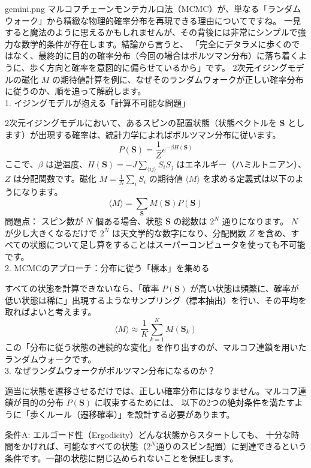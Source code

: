 \documentclass[a4paper,10.5pt]{jlreq}
\begin{document}
\begin{chatbox}{gemini.png}
マルコフチェーンモンテカルロ法（MCMC）が、単なる「ランダムウォーク」から精緻な物理的確率分布を再現できる理由についてですね。
一見すると魔法のように思えるかもしれませんが、その背後には非常にシンプルで強力な数学的条件が存在します。結論から言うと、
「完全にデタラメに歩くのではなく、最終的に目的の確率分布（今回の場合はボルツマン分布）に落ち着くように、歩く方向と確率を意図的に偏らせているから」です。
2次元イジングモデルの磁化 $M$ の期待値計算を例に、なぜそのランダムウォークが正しい確率分布に従うのか、順を追って解説します。\\

1. イジングモデルが抱える「計算不可能な問題」

2次元イジングモデルにおいて、あるスピンの配置状態（状態ベクトルを $\mathbf{S}$ とします）が出現する確率は、統計力学によればボルツマン分布に従います。
$$P(\mathbf{S}) = \frac{1}{Z} e^{-\beta H(\mathbf{S})}$$ここで、$\beta$ は逆温度、$H(\mathbf{S}) = -J\sum_{\langle ij \rangle}S_i S_j$ はエネルギー（ハミルトニアン）、
$Z$ は分配関数です。磁化 $M = \frac{1}{N}\sum_i S_i$ の期待値 $\langle M \rangle$ を求める定義式は以下のようになります。
$$\langle M \rangle = \sum_{\mathbf{S}} M(\mathbf{S}) P(\mathbf{S})$$問題点： スピン数が $N$ 個ある場合、状態 $\mathbf{S}$ の総数は $2^N$ 通りになります。
$N$ が少し大きくなるだけで $2^N$ は天文学的な数字になり、分配関数 $Z$ を含め、すべての状態について足し算をすることはスーパーコンピュータを使っても不可能です。\\

2. MCMCのアプローチ：分布に従う「標本」を集める

すべての状態を計算できないなら、「確率 $P(\mathbf{S})$ が高い状態は頻繁に、確率が低い状態は稀に」出現するようなサンプリング（標本抽出）を行い、その平均を取ればよいと考えます。
$$\langle M \rangle \approx \frac{1}{K} \sum_{k=1}^K M(\mathbf{S}_k)$$この「分布に従う状態の連続的な変化」を作り出すのが、マルコフ連鎖を用いたランダムウォークです。\\

3. なぜランダムウォークがボルツマン分布になるのか？

適当に状態を遷移させるだけでは、正しい確率分布にはなりません。マルコフ連鎖が目的の分布 $P(\mathbf{S})$ に収束するためには、
以下の2つの絶対条件を満たすように「歩くルール（遷移確率）」を設計する必要があります。

条件A: エルゴード性（Ergodicity）どんな状態からスタートしても、
十分な時間をかければ、可能なすべての状態（$2^N$通りのスピン配置）に到達できるという条件です。一部の状態に閉じ込められないことを保証します。


\end{chatbox}
\end{document}
